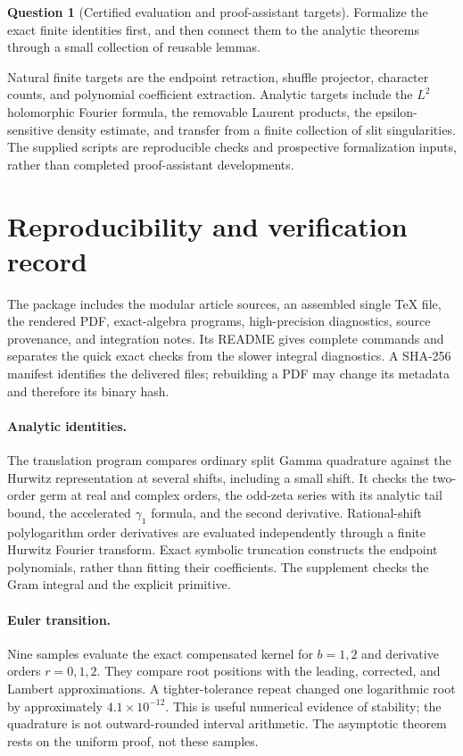 \documentclass[11pt,a4paper]{article}
\numberwithin{equation}{section}
\theoremstyle{definition}
\newtheorem{question}[theorem]{Question}
\theoremstyle{remark}
\begin{document}
\begin{question}[Certified evaluation and proof-assistant targets]
Formalize the exact finite identities first, and then connect them to
the analytic theorems through a small collection of reusable lemmas.
\end{question}
Natural finite targets are the endpoint retraction, shuffle projector,
character counts, and polynomial coefficient extraction. Analytic
targets include the $L^2$ holomorphic Fourier formula, the removable
Laurent products, the epsilon-sensitive density estimate, and transfer
from a finite collection of slit singularities. The supplied scripts
are reproducible checks and prospective formalization inputs, rather
than completed proof-assistant developments.

\section{Reproducibility and verification record}
\label{sec:verification}

The package includes the modular article sources, an assembled single
TeX file, the rendered PDF, exact-algebra programs, high-precision
diagnostics, source provenance, and integration notes. Its README
gives complete commands and separates the quick exact checks from
the slower integral diagnostics. A SHA-256 manifest identifies the
delivered files; rebuilding a PDF may change its metadata and therefore
its binary hash.

\paragraph{Analytic identities.}
The translation program compares ordinary split Gamma quadrature
against the Hurwitz representation at several shifts, including a
small shift. It checks the two-order germ at real and complex orders,
the odd-zeta series with its analytic tail bound, the accelerated
$\gamma_1$ formula, and the second derivative. Rational-shift
polylogarithm order derivatives are evaluated independently through a
finite Hurwitz Fourier transform. Exact symbolic truncation constructs
the endpoint polynomials, rather than fitting their coefficients.
The supplement checks the Gram integral and the explicit primitive.

\paragraph{Euler transition.}
Nine samples evaluate the exact compensated kernel for $b=1,2$ and
derivative orders $r=0,1,2$. They compare root positions with the
leading, corrected, and Lambert approximations. A tighter-tolerance
repeat changed one logarithmic root by approximately
$4.1\times10^{-12}$. This is useful numerical evidence of stability;
the quadrature is not outward-rounded interval arithmetic. The
asymptotic theorem rests on the uniform proof, not these samples.
\end{document}
